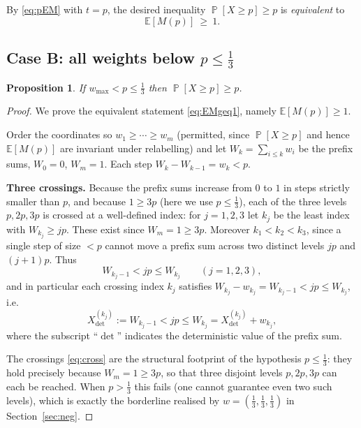 \documentclass[11pt]{article}
\newtheorem{proposition}{Proposition}
\theoremstyle{definition}
\DeclareMathOperator{\PP}{\mathbb{P}}
\newcommand{\E}{\mathbb{E}}
\begin{document}
By \eqref{eq:pEM} with $t=p$, the desired inequality $\PP[X\ge p]\ge p$ is
\emph{equivalent} to
\begin{equation}\label{eq:EMgeq1}
\E[M(p)]\ \ge\ 1.
\end{equation}

\subsection{Case B: all weights below \texorpdfstring{$p\le\tfrac13$}{p<=1/3}}

\begin{proposition}\label{prop:caseB}
If $w_{\max}<p\le\tfrac13$ then $\PP[X\ge p]\ge p$.
\end{proposition}

\begin{proof}
We prove the equivalent statement \eqref{eq:EMgeq1}, namely $\E[M(p)]\ge1$.

Order the coordinates so $w_1\ge\cdots\ge w_m$ (permitted, since
$\PP[X\ge p]$ and hence $\E[M(p)]$ are invariant under relabelling) and let
$W_k=\sum_{i\le k}w_i$ be the prefix sums, $W_0=0$, $W_m=1$. Each step
$W_k-W_{k-1}=w_k<p$.

\medskip\noindent\textbf{Three crossings.}
Because the prefix sums increase from $0$ to $1$ in steps strictly smaller than
$p$, and because $1\ge 3p$ (here we use $p\le\tfrac13$), each of the three
levels $p,2p,3p$ is crossed at a well-defined index: for $j=1,2,3$ let $k_j$ be
the least index with $W_{k_j}\ge jp$. These exist since $W_m=1\ge 3p$. Moreover
$k_1<k_2<k_3$, since a single step of size $<p$ cannot move a prefix sum across
two distinct levels $jp$ and $(j+1)p$. Thus
\begin{equation}\label{eq:cross}
W_{k_j-1}<jp\le W_{k_j}\qquad(j=1,2,3),
\end{equation}
and in particular each crossing index $k_j$ satisfies
$W_{k_j}-w_{k_j}=W_{k_j-1}<jp\le W_{k_j}$, i.e.
\begin{equation}\label{eq:crosspivot}
X^{(k_j)}_{\det}:=W_{k_j-1}<jp\le W_{k_j}=X^{(k_j)}_{\det}+w_{k_j},
\end{equation}
where the subscript ``$\det$'' indicates the deterministic value of the prefix
sum.

The crossings \eqref{eq:cross} are the structural footprint of the hypothesis
$p\le\tfrac13$: they hold precisely because $W_m=1\ge 3p$, so that three
disjoint levels $p,2p,3p$ can each be reached. When $p>\tfrac13$ this fails (one
cannot guarantee even two such levels), which is exactly the borderline realised
by $w=(\tfrac13,\tfrac13,\tfrac13)$ in Section~\ref{sec:neg}.


\end{proof}
\end{document}
